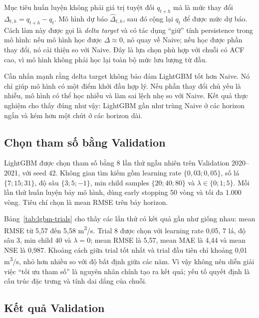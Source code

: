 Mục tiêu huấn luyện không phải giá trị tuyệt đối $q_{t+h}$ mà là mức thay đổi
$\Delta_{t,h}=q_{t+h}-q_t$. Mô hình dự báo $\hat{\Delta}_{t,h}$, sau đó cộng lại
$q_t$ để được mức dự báo. Cách làm này được gọi là \emph{delta target} và có tác
dụng “giữ” tính persistence trong mô hình: nếu mô hình học được $\Delta \approx 0$,
nó quay về Naive; nếu học được phần thay đổi, nó cải thiện so với Naive. Đây là lựa
chọn phù hợp với chuỗi có ACF cao, vì mô hình không phải học lại toàn bộ mức lưu
lượng từ đầu.

Cần nhấn mạnh rằng delta target không bảo đảm LightGBM tốt hơn Naive. Nó chỉ giúp
mô hình có một điểm khởi đầu hợp lý. Nếu phần thay đổi chủ yếu là nhiễu, mô hình có
thể học nhiễu và làm sai lệch nhẹ so với Naive. Kết quả thực nghiệm cho thấy đúng
như vậy: LightGBM gần như trùng Naive ở các horizon ngắn và kém hơn một chút ở các
horizon dài.

\subsection{Chọn tham số bằng Validation}

LightGBM được chọn tham số bằng 8 lần thử ngẫu nhiên trên Validation 2020--2021,
với seed 42. Không gian tìm kiếm gồm learning rate $\{0{,}03;0{,}05\}$, số lá
$\{7;15;31\}$, độ sâu $\{3;5;-1\}$, min child samples $\{20;40;80\}$ và
$\lambda \in \{0;1;5\}$. Mỗi lần thử huấn luyện bảy mô hình, dùng early stopping 50
vòng và tối đa 1.000 vòng. Tiêu chí chọn là mean RMSE trên bảy horizon.

\begin{table}[H]
\centering
\footnotesize
\setlength{\tabcolsep}{3.2pt}

\caption{Kết quả 8 lần thử tham số LightGBM trên Validation.}
\label{tab:lgbm-trials}
\end{table}

Bảng~\ref{tab:lgbm-trials} cho thấy các lần thử có kết quả gần như giống nhau:
mean RMSE từ 5,57 đến 5,58 m\textsuperscript{3}/s. Trial 8 được chọn với
learning rate 0,05, 7 lá, độ sâu 3, min child 40 và $\lambda=0$; mean RMSE là 5,57,
mean MAE là 4,44 và mean NSE là 0,987. Khoảng cách giữa trial tốt nhất và trial đầu
tiên chỉ khoảng 0,01 m\textsuperscript{3}/s, nhỏ hơn nhiều so với độ bất định giữa
các năm. Vì vậy không nên diễn giải việc “tối ưu tham số” là nguyên nhân chính tạo
ra kết quả; yếu tố quyết định là cấu trúc đặc trưng và tính dai dẳng của chuỗi.

\subsection{Kết quả Validation}

